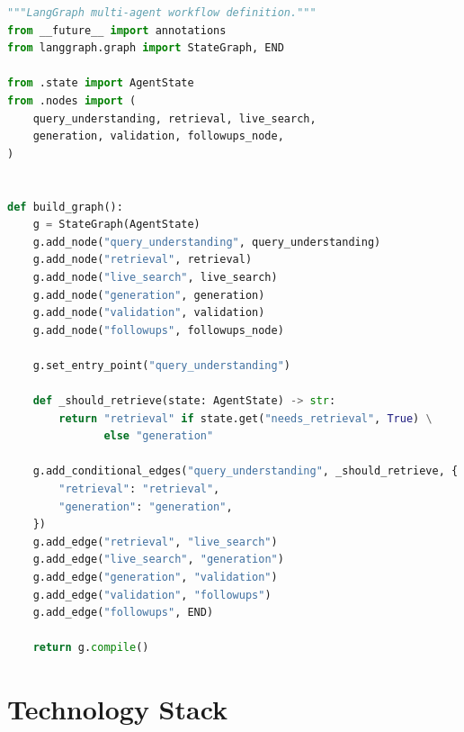 \begin{lstlisting}[language=Python, caption=agents/graph.py -- LangGraph StateGraph with Conditional Edges, basicstyle=\tiny\ttfamily]
"""LangGraph multi-agent workflow definition."""
from __future__ import annotations
from langgraph.graph import StateGraph, END

from .state import AgentState
from .nodes import (
    query_understanding, retrieval, live_search,
    generation, validation, followups_node,
)


def build_graph():
    g = StateGraph(AgentState)
    g.add_node("query_understanding", query_understanding)
    g.add_node("retrieval", retrieval)
    g.add_node("live_search", live_search)
    g.add_node("generation", generation)
    g.add_node("validation", validation)
    g.add_node("followups", followups_node)

    g.set_entry_point("query_understanding")

    def _should_retrieve(state: AgentState) -> str:
        return "retrieval" if state.get("needs_retrieval", True) \
               else "generation"

    g.add_conditional_edges("query_understanding", _should_retrieve, {
        "retrieval": "retrieval",
        "generation": "generation",
    })
    g.add_edge("retrieval", "live_search")
    g.add_edge("live_search", "generation")
    g.add_edge("generation", "validation")
    g.add_edge("validation", "followups")
    g.add_edge("followups", END)

    return g.compile()
\end{lstlisting}

\section*{Technology Stack}


